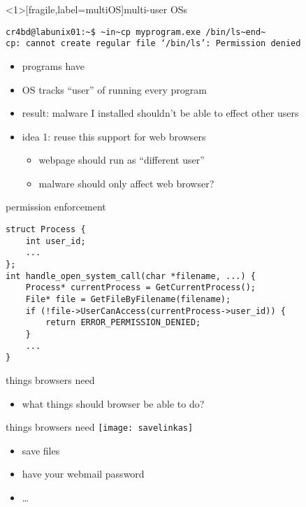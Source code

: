 \begin{frame}<1>[fragile,label=multiOS]{multi-user OSs}
\begin{lstlisting}
cr4bd@labunix01:~$ ~in~cp myprogram.exe /bin/ls~end~
cp: cannot create regular file ‘/bin/ls’: Permission denied
\end{lstlisting}
    \begin{itemize}
        \item programs have 
        \item<2-> OS tracks ``user'' of running every program
        \item<2-> result: malware I installed shouldn't be able to effect other users
        \item<2-> idea 1: reuse this support for web browsers
            \begin{itemize}
            \item webpage should run as ``different user''
            \item malware should only affect web browser?
            \end{itemize}
    \end{itemize}
\end{frame}

\begin{frame}[fragile,label=permEnforce]{permission enforcement}
    \begin{verbatim}
struct Process {
    int user_id;
    ...
};
int handle_open_system_call(char *filename, ...) {
    Process* currentProcess = GetCurrentProcess();
    File* file = GetFileByFilename(filename);
    if (!file->UserCanAccess(currentProcess->user_id)) {
        return ERROR_PERMISSION_DENIED;
    }
    ...
}
\end{verbatim}
\end{frame}


\begin{frame}{things browsers need}
    \begin{itemize}
    \item what things should browser be able to do?
    \end{itemize}
\end{frame}

\begin{frame}{things browsers need}
    \texttt{[image: savelinkas]}
    \begin{itemize}
        \item save files
        \item have your webmail password
        \item \ldots
    \end{itemize}
\end{frame}

